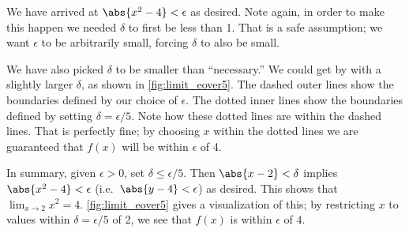 {\noindent
We have arrived at $\abs{x^2 - 4}<\epsilon$ as desired.  Note again, in order to make this happen we needed $\delta$ to first be less than 1.  That is a safe assumption; we want $\epsilon$ to be arbitrarily small, forcing $\delta$ to also be small. 

We have also picked $\delta$ to be smaller than ``necessary.'' We could get by with a slightly larger $\delta$, as shown in \autoref{fig:limit_eover5}. The dashed outer lines show the boundaries defined by our choice of $\epsilon$. The dotted inner lines show the boundaries defined by setting $\delta = \epsilon/5$. Note how these dotted lines are within the dashed lines. That is perfectly fine; by choosing $x$ within the dotted lines we are guaranteed that $f(x)$ will be within $\epsilon$ of 4.%


In summary, given $\epsilon > 0$, set $\delta\leq\epsilon/5$.  Then $\abs{x - 2} < \delta$ implies 
$\abs{x^2 - 4}< \epsilon$ (i.e.\ $\abs{y - 4}< \epsilon$) as desired.  This shows that $\displaystyle \lim_{x\rightarrow 2} x^2 = 4 $. \autoref{fig:limit_eover5} gives a visualization of this; by restricting $x$ to values within $\delta = \epsilon/5$ of 2, we see that $f(x)$ is within $\epsilon$ of $4$.}

